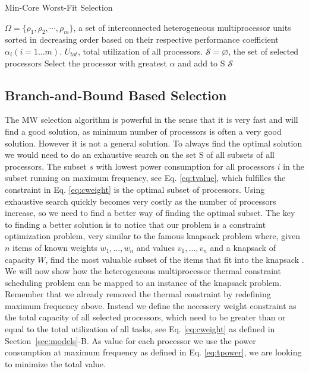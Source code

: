 \documentclass[conference]{IEEEtran}
\begin{document}
\begin{algorithm} 
\caption{Min-Core Worst-Fit Selection} \label{algo:mw}
\footnotesize
\begin{algorithmic}[1]
\REQUIRE $\Omega = \{\rho_1, \rho_2,\cdots, \rho_m\}$, a set of interconnected heterogeneous multiprocessor units 
 sorted in decreasing order based on their respective performance coefficient $\alpha_i (i=1\ldots m)$.
 $U_{tot}$, total utilization of all processors.
$\mathcal{S} = \varnothing$, the set of selected processors
	\STATE Select the processor with greatest $\alpha$ and add to {\cal S}
\ENDWHILE
\RETURN $\mathcal{S}$  
\end{algorithmic}
\end{algorithm}


\subsection{Branch-and-Bound Based Selection}
The MW selection algorithm is powerful in the sense that it is very fast and will find a good solution, as minimum number of processors is often a very good solution. However it is not a general solution. To always find the optimal solution we would need to do an exhaustive search on the set {\cal S} of all subsets of all processors. The subset $s$ with lowest power consumption for all processors $i$ in the subset running on maximum frequency, see Eq. \ref{eq:tvalue}, which fulfilles the constraint in Eq. \ref{eq:cweight} is the optimal subset of processors. Using exhaustive search quickly becomes very costly as the number of processors increase, so we need to find a better way of finding the optimal subset.
The key to finding a better solution is to notice that our problem is a constraint optimization problem, very similar to the famous knapsack problem where, given $n$ items of known weights $w_1, \ldots, w_n$ and values $v_1, \ldots, v_n$ and a knapsack of capacity $W$, find the most valuable subset of the items that fit into the knapsack \cite{Levitin06}. We will now show how the heterogeneous multiprocessor thermal constraint scheduling problem can be mapped to an instance of the knapsack problem. Remember that we already removed the thermal constraint by redefining maximum frequency above. Instead we define the necessery weight constraint as the total capacity of all selected processors, which need to be greater than or equal to the total utilization of all tasks, see Eq. \ref{eq:cweight} as defined in Section~\ref{sec:models}-B. As value for each processor we use the power consumption at maximum frequency as defined in Eq. \ref{eq:tpower}, we are looking to minimize the total value.
\end{document}

